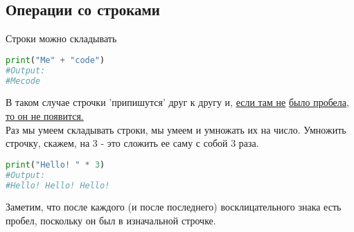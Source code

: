 \documentclass[12pt]{article} %
\newcommand \tab[1][1cm]{\hspace*{#1}}
\begin{document}
\subsection{Операции со строками}
Строки можно складывать 
\begin{lstlisting}[language=Python]
print("Me" + "code")
#Output:
#Mecode
\end{lstlisting}
\tab В таком случае строчки 'припишутся' друг к другу и, \underline{если там не} \underline{было пробела, то он не появится.}\\
\tab Раз мы умеем складывать строки, мы умеем и умножать их на число. Умножить строчку, скажем, на 3 - это сложить ее саму с собой 3 раза.
\begin{lstlisting}[language=Python]
print("Hello! " * 3)
#Output:
#Hello! Hello! Hello!
\end{lstlisting}
\tab Заметим, что после каждого (и после последнего) восклицательного знака есть пробел, поскольку он был в изначальной строчке. 
\end{document}
